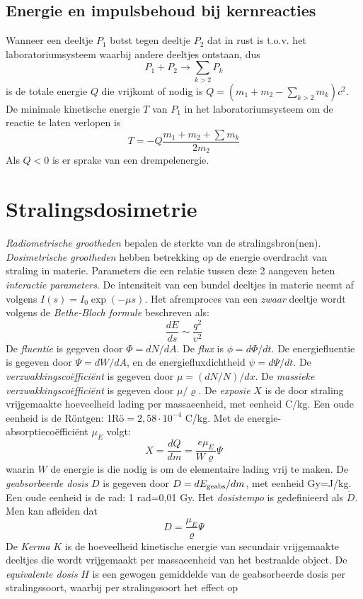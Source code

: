 \documentclass[twoside]{report}
\begin{document}
\subsection{Energie en impulsbehoud bij kernreacties}
Wanneer een deeltje $P_1$ botst tegen deeltje $P_2$ dat in rust is t.o.v. het
laboratoriumsysteem waarbij andere deeltjes ontstaan, dus
\[
P_1+P_2\rightarrow\sum_{k>2} P_k
\]
is de totale energie $Q$ die vrijkomt of nodig is
$Q=(m_1+m_2-\sum\limits_{k>2}m_k)c^2$.
\npar
De minimale kinetische energie $T$ van $P_1$ in het laboratoriumsysteem om de
reactie te laten verlopen is
\[
T=-Q\frac{m_1+m_2+\sum m_k}{2m_2}
\]
Als $Q<0$ is er sprake van een drempelenergie.

\section{Stralingsdosimetrie}
{\it Radiometrische grootheden} bepalen de sterkte van de stralingsbron(nen).
{\it Dosimetrische grootheden} hebben betrekking op de energie overdracht van
straling in materie. Parameters die een relatie tussen deze 2 aangeven heten
{\it interactie parameters}. De intensiteit van een bundel deeltjes in materie
neemt af volgens $I(s)=I_0\exp(-\mu s)$. Het afremproces van een {\it zwaar}
deeltje wordt volgens de {\it Bethe-Bloch formule} beschreven als:
\[
\frac{dE}{ds}\sim\frac{q^2}{v^2}
\]
De {\it fluentie} is gegeven door $\Phi=dN/dA$. De {\it flux} is
$\phi=d\Phi/dt$. De energiefluentie is gegeven door $\Psi=dW/dA$, en de
energiefluxdichtheid $\psi=d\Psi/dt$. De {\it verzwakkingsco\"effici\"ent} is
gegeven door $\mu=(dN/N)/dx$. De {\it massieke verzwakkingsco\"effici\"ent}
is gegeven door $\mu/\varrho$.
\npar
De {\it exposie} $X$ is de door straling vrijgemaakte hoeveelheid lading per
massaeenheid, met eenheid C/kg. Een oude eenheid is de R\"ontgen:
1R\"o$=2,58\cdot10^{-4}$ C/kg. Met de energie-absorptieco\"effici\"ent
$\mu_E$ volgt:
\[
X=\frac{dQ}{dm}=\frac{e\mu_E}{W\varrho}\Psi
\]
waarin $W$ de energie is die nodig is om de elementaire lading vrij te maken.
\npar
De {\it geabsorbeerde dosis} $D$ is gegeven door $D=dE_{\rm geabs}/dm$, met
eenheid Gy=J/kg. Een oude eenheid is de rad: 1 rad=0,01 Gy. Het
{\it dosistempo} is gedefinieerd als $\dot{D}$. Men kan afleiden dat
\[
D=\frac{\mu_E}{\varrho}\Psi
\]
De {\it Kerma} $K$ is de hoeveelheid kinetische energie van secundair
vrijgemaakte deeltjes die wordt vrijgemaakt per massaeenheid van het
bestraalde object.
\npar
De {\it equivalente dosis} $H$ is een gewogen gemiddelde van de geabsorbeerde
dosis per stralingssoort, waarbij per stralingssoort het effect op
\end{document}
